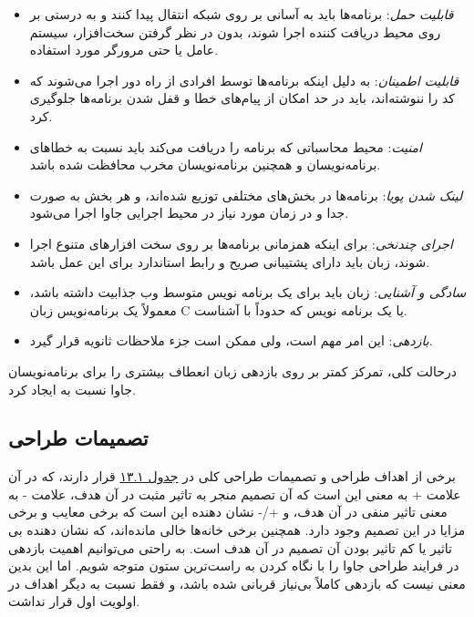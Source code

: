\documentclass[a4paper,12pt]{report}
\begin{document}
	\begin{itemize}[nosep]
		\renewcommand{\labelitemi}{\color{gray}\scriptsize$\blacksquare$}
		\item 
		\textit{
		قابلیت حمل}: برنامه‌ها باید به آسانی بر روی شبکه انتقال پیدا کنند و به درستی بر روی محیط دریافت کننده اجرا شوند، بدون در نظر گرفتن سخت‌افزار، سیستم عامل یا حتی مرورگر مورد استفاده.
		\item
		\textit{
		قابلیت اطمینان}: به دلیل اینکه برنامه‌ها توسط افرادی از راه دور اجرا می‌شوند که کد را ننوشته‌اند، باید در حد امکان از پیام‌های خطا و قفل شدن برنامه‌ها جلوگیری کرد.
		\item \textit{
		امنیت}: محیط محاسباتی که برنامه را دریافت می‌کند باید نسبت به خطا‌های برنامه‌نویسان و همچنین برنامه‌نویسان مخرب محافظت شده باشد.
		\item \textit{
		لینک شدن پویا}: برنامه‌ها در بخش‌های مختلفی توزیع شده‌اند، و هر بخش به صورت جدا و در زمان مورد نیاز در محیط اجرایی جاوا اجرا می‌شود.
		\item \textit{
		اجرای چندنخی}: برای اینکه همزمانی برنامه‌ها بر روی سخت افزار‌های متنوع اجرا شوند، زبان باید دارای پشتیبانی صریح و رابط استاندارد برای این عمل  باشد.
		\item \textit{
		سادگی و آشنایی}: زبان باید برای یک برنامه نویس متوسط وب جذابیت داشته باشد، معمولاً یک برنامه‌نویس زبان C یا یک برنامه نویس که حدوداً با 
		آشناست.
		\item \textit{
		بازدهی}: این امر مهم است، ولی ممکن است جزء ملاحظات ثانویه قرار گیرد.
	\end{itemize}
	
	درحالت کلی، تمرکز کمتر بر روی بازدهی زبان انعطاف بیشتری را برای برنامه‌نویسان جاوا نسبت به 
	ایجاد کرد.	
	
	\subsection{تصمیمات طراحی}\label{subsec2:sec1:chap13}
	برخی از اهداف طراحی و تصمیمات طراحی کلی در 
	\hyperref[table1:chap13]{جدول ۱۳.۱}
	 قرار دارند، که در آن علامت + به معنی این است که آن تصمیم منجر به تاثیر مثبت در آن هدف، علامت - به معنی تاثیر منفی در آن هدف، و +/-	نشان دهنده این است که برخی معایب و برخی مزایا در این تصمیم وجود دارد. همچنین برخی خانه‌ها خالی مانده‌اند، که نشان دهنده بی تاثیر یا کم تاثیر بودن آن تصمیم در آن هدف است. به راحتی می‌توانیم اهمیت بازدهی در فرایند طراحی جاوا را با نگاه کردن به  راست‌ترین ستون متوجه شویم. اما این بدین معنی نیست که بازدهی کاملاً بی‌نیاز قربانی شده باشد، و فقط نسبت به دیگر اهداف در اولویت اول قرار نداشت.
	
\end{document}
